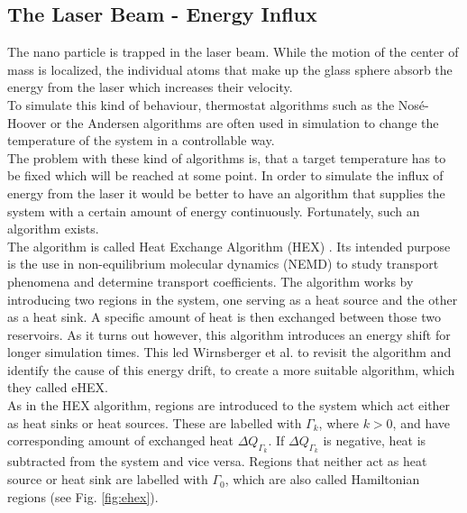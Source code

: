 \documentclass[12pt]{article}
\begin{document}
\subsection{The Laser Beam - Energy Influx}
The nano particle is trapped in the laser beam. While the motion of the center of mass is localized, the
individual atoms that make up the glass sphere absorb the energy from the laser which increases their velocity.\\
To simulate this kind of behaviour, thermostat algorithms \cite{Huenenberger2005} such as the Nos\'e-Hoover \cite{Nose1984,Hoover1985} or the Andersen
\cite{Andersen1980} algorithms are often used in simulation to change the temperature of the system in a controllable way.\\
The problem with these kind of algorithms is, that a target temperature has to be fixed which will be reached at some point. In order to simulate the
influx of energy from the laser it would be better to have an algorithm that supplies the system with a certain amount of energy continuously.
Fortunately, such an algorithm exists.\\
The algorithm is called Heat Exchange Algorithm (HEX) \cite{Hafskjold1993}. Its intended purpose is the use in non-equilibrium molecular dynamics
(NEMD) to study transport phenomena and determine transport coefficients. The algorithm works by introducing two regions in the system, one serving as
a heat source and the other as a heat sink. A specific amount of heat is then exchanged between those two reservoirs. As it turns out however, this
algorithm introduces an energy shift for longer simulation times. This led Wirnsberger et al. \cite{Wirnsberger2015} to revisit the algorithm and 
identify the cause of this energy drift, to create a more suitable algorithm, which they called eHEX.\\
As in the HEX algorithm, regions are introduced to the system which act either as heat sinks or heat sources. These are labelled with $\Gamma_k$,
where $k > 0$, and have corresponding amount of exchanged heat $\Delta Q_{\Gamma_k}$. If $\Delta Q_{\Gamma_k}$ is negative, heat is subtracted from
the system and vice versa. Regions that neither act as heat source or heat sink are labelled with $\Gamma_0$, which are also called
Hamiltonian regions (see Fig. \ref{fig:ehex}). 
\end{document}
